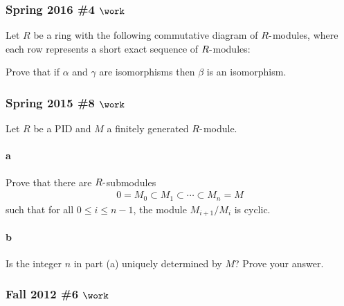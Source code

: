 \hypertarget{spring-2016-4-work}{%
\subsubsection{\texorpdfstring{Spring 2016 \#4
\(\work\)}{Spring 2016 \#4 \textbackslash work}}\label{spring-2016-4-work}}

Let \(R\) be a ring with the following commutative diagram of
\(R{\hbox{-}}\)modules, where each row represents a short exact sequence
of \(R{\hbox{-}}\)modules:

\begin{center}
\end{center}

Prove that if \(\alpha\) and \(\gamma\) are isomorphisms then \(\beta\)
is an isomorphism.

\hypertarget{spring-2015-8-work}{%
\subsubsection{\texorpdfstring{Spring 2015 \#8
\(\work\)}{Spring 2015 \#8 \textbackslash work}}\label{spring-2015-8-work}}

Let \(R\) be a PID and \(M\) a finitely generated \(R{\hbox{-}}\)module.

\hypertarget{a-87}{%
\paragraph{a}\label{a-87}}

Prove that there are \(R{\hbox{-}}\)submodules
\begin{align*}
0 = M_0 \subset M_1 \subset \cdots \subset M_n = M
\end{align*}
such that for all \(0\leq i \leq n-1\), the module \(M_{i+1}/M_i\) is
cyclic.

\hypertarget{b-77}{%
\paragraph{b}\label{b-77}}

Is the integer \(n\) in part (a) uniquely determined by \(M\)? Prove
your answer.

\hypertarget{fall-2012-6-work}{%
\subsubsection{\texorpdfstring{Fall 2012 \#6
\(\work\)}{Fall 2012 \#6 \textbackslash work}}\label{fall-2012-6-work}}

